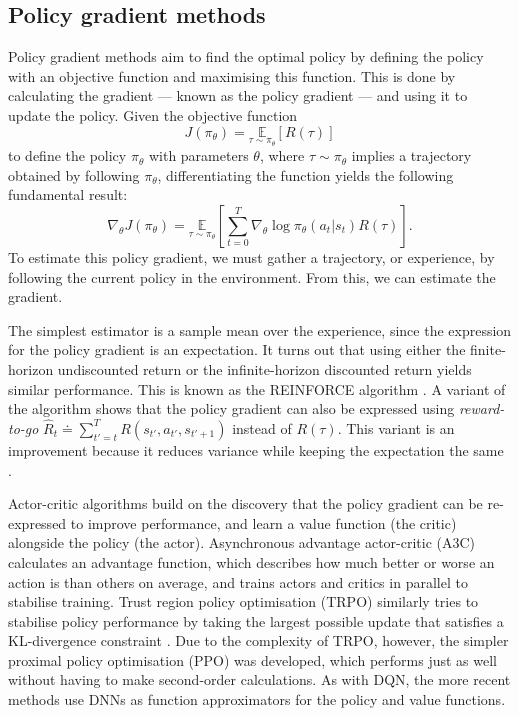 \documentclass[12pt,a4paper]{article}
\begin{document}
\subsection{Policy gradient methods}
Policy gradient methods aim to find the optimal policy by defining the policy with an objective function and maximising this function. This is done by calculating the gradient --- known as the policy gradient --- and using it to update the policy. Given the objective function $$J(\pi_{\theta}) = \underset{\tau \sim \pi_{\theta}}{\mathbb{E}}\left[R(\tau)\right]$$ to define the policy $\pi_\theta$ with parameters $\theta$, where $\tau \sim \pi_{\theta}$ implies a trajectory obtained by following $\pi_\theta$, differentiating the function yields the following fundamental result: $$\nabla_{\theta} J(\pi_{\theta}) = \underset{\tau \sim \pi_{\theta}}{\mathbb{E}} \left[{\sum_{t=0}^{T} \nabla_{\theta} \log \pi_{\theta}(a_t |s_t) R(\tau)}\right].$$ To estimate this policy gradient, we must gather a trajectory, or experience, by following the current policy in the environment. From this, we can estimate the gradient.

The simplest estimator is a sample mean over the experience, since the expression for the policy gradient is an expectation. It turns out that using either the finite-horizon undiscounted return or the infinite-horizon discounted return yields similar performance. This is known as the REINFORCE algorithm \cite{Williams1992}. A variant of the algorithm shows that the policy gradient can also be expressed using \emph{reward-to-go} $\hat{R}_t \doteq \sum_{t'=t}^T R(s_{t'}, a_{t'}, s_{t'+1})$ instead of $R(\tau)$. This variant is an improvement because it reduces variance while keeping the expectation the same \cite{SpinningUp2018}. 

Actor-critic algorithms \cite{Konda2000} build on the discovery that the policy gradient can be re-expressed to improve performance, and learn a value function (the critic) alongside the policy (the actor). Asynchronous advantage actor-critic (A3C) \cite{mnih2016asynchronous} calculates an advantage function, which describes how much better or worse an action is than others on average, and trains actors and critics in parallel to stabilise training. Trust region policy optimisation (TRPO) \cite{DBLP:journals/corr/SchulmanLMJA15} similarly tries to stabilise policy performance by taking the largest possible update that satisfies a KL-divergence constraint \cite{kullback1951information}. Due to the complexity of TRPO, however, the simpler proximal policy optimisation (PPO) \cite{DBLP:journals/corr/SchulmanWDRK17} was developed, which performs just as well without having to make second-order calculations. As with DQN, the more recent methods use DNNs as function approximators for the policy and value functions.
\end{document}
